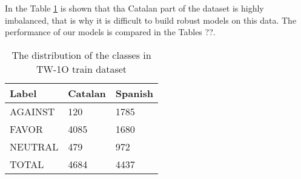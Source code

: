 \documentclass[10pt, a4paper]{article}
\begin{document}
In the Table \ref{tab:twdatasetdistr} is shown that tha Catalan part of the dataset is highly imbalanced, that is why it is difficult to build robust models on this data. The performance of our models is compared in the Tables ??. 

\begin{table}[!h]
\begin{center}
\begin{tabularx}{\columnwidth}{|l|l|X|}

      \hline
      Label&Catalan&Spanish\\
      \hline
    AGAINST & 120&1785\\
      \hline
      FAVOR & 4085&1680\\
      \hline
     NEUTRAL & 479&972\\
      \hline
      TOTAL & 4684&4437\\
      \hline

\end{tabularx}
\caption{The distribution of the classes in TW-1O train dataset}
 \end{center}
 \label{tab:twdatasetdistr}
\end{table}



\end{document}

